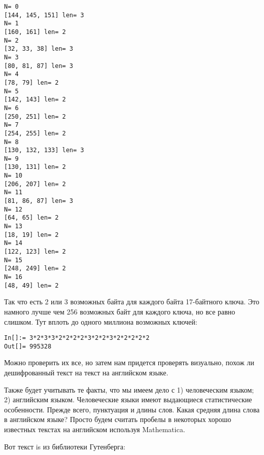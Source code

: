 \begin{lstlisting}
N= 0
[144, 145, 151] len= 3
N= 1
[160, 161] len= 2
N= 2
[32, 33, 38] len= 3
N= 3
[80, 81, 87] len= 3
N= 4
[78, 79] len= 2
N= 5
[142, 143] len= 2
N= 6
[250, 251] len= 2
N= 7
[254, 255] len= 2
N= 8
[130, 132, 133] len= 3
N= 9
[130, 131] len= 2
N= 10
[206, 207] len= 2
N= 11
[81, 86, 87] len= 3
N= 12
[64, 65] len= 2
N= 13
[18, 19] len= 2
N= 14
[122, 123] len= 2
N= 15
[248, 249] len= 2
N= 16
[48, 49] len= 2
\end{lstlisting}

Так что есть 2 или 3 возможных байта для каждого байта 17-байтного ключа.
Это намного лучше чем 256 возможных байт для каждого ключа, но все равно слишком.
Тут вплоть до одного миллиона возможных ключей:

\begin{lstlisting}[caption=Mathematica,style=custommath]
In[]:= 3*2*3*3*2*2*2*2*3*2*2*3*2*2*2*2*2
Out[]= 995328
\end{lstlisting}

Можно проверить их все, но затем нам придется проверять визуально, похож ли дешифрованный текст на текст на английском языке.

Также будет учитывать те факты, что мы имеем дело с 1) человеческим языком; 2) английским языком.
Человеческие языки имеют выдающиеся статистические особенности.
Прежде всего, пунктуация и длины слов.
Какая средняя длина слова в английском языке?
Просто будем считать пробелы в некоторых хорошо известных текстах на английском используя Mathematica.

Вот текст is \href{http://www.gutenberg.org/cache/epub/100/pg100.txt}{}
из библиотеки Гутенберга:

